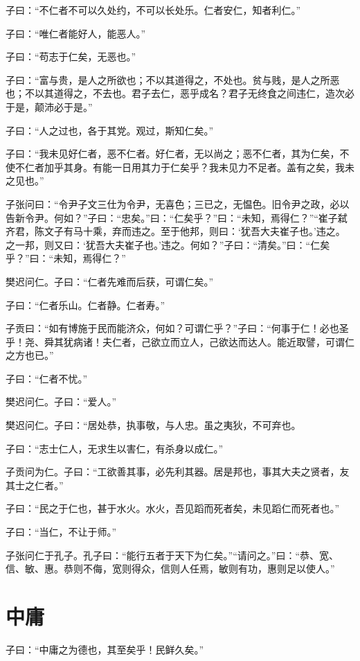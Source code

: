 \documentclass[a5paper]{ctexbook}
\begin{document}
    子曰：“不仁者不可以久处约，不可以长处乐。仁者安仁，知者利仁。”

    子曰：“唯仁者能好人，能恶人。”

    子曰：“苟志于仁矣，无恶也。”

    子曰：“富与贵，是人之所欲也；不以其道得之，不处也。贫与贱，是人之所恶也；不以其道得之，不去也。君子去仁，恶乎成名？君子无终食之间违仁，造次必于是，颠沛必于是。”

    子曰：“人之过也，各于其党。观过，斯知仁矣。”

    子曰：“我未见好仁者，恶不仁者。好仁者，无以尚之；恶不仁者，其为仁矣，不使不仁者加乎其身。有能一日用其力于仁矣乎？我未见力不足者。盖有之矣，我未之见也。”

    子张问曰：“令尹子文三仕为令尹，无喜色；三已之，无愠色。旧令尹之政，必以告新令尹。何如？”子曰：“忠矣。”曰：“仁矣乎？”曰：“未知，焉得仁？”“崔子弑齐君，陈文子有马十乘，弃而违之。至于他邦，则曰：‘犹吾大夫崔子也。’违之。之一邦，则又曰：‘犹吾大夫崔子也。’违之。何如？”子曰：“清矣。”曰：“仁矣乎？”曰：“未知，焉得仁？”

    樊迟问仁。子曰：“仁者先难而后获，可谓仁矣。”

    子曰：“仁者乐山。仁者静。仁者寿。”

    子贡曰：“如有博施于民而能济众，何如？可谓仁乎？”子曰：“何事于仁！必也圣乎！尧、舜其犹病诸！夫仁者，己欲立而立人，己欲达而达人。能近取譬，可谓仁之方也已。”

    子曰：“仁者不忧。”

    樊迟问仁。子曰：“爱人。”

    樊迟问仁。子曰：“居处恭，执事敬，与人忠。虽之夷狄，不可弃也。

    子曰：“志士仁人，无求生以害仁，有杀身以成仁。”

    子贡问为仁。子曰：“工欲善其事，必先利其器。居是邦也，事其大夫之贤者，友其士之仁者。”

    子曰：“民之于仁也，甚于水火。水火，吾见蹈而死者矣，未见蹈仁而死者也。”

    子曰：“当仁，不让于师。”

    子张问仁于孔子。孔子曰：“能行五者于天下为仁矣。”“请问之。”曰：“恭、宽、信、敏、惠。恭则不侮，宽则得众，信则人任焉，敏则有功，惠则足以使人。”

    \chapter{中庸}

    子曰：“中庸之为德也，其至矣乎！民鲜久矣。”
\end{document}
